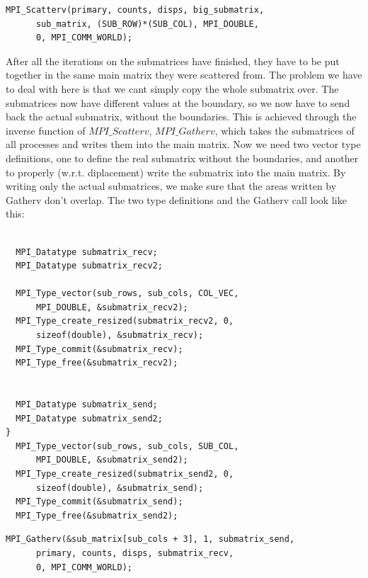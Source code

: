 \documentclass[11pt]{article}
\begin{document}
	
\begin{lstlisting}[label=some-code, caption=$MPI\_Scatterv$ call]
  MPI_Scatterv(primary, counts, disps, big_submatrix, 
      sub_matrix, (SUB_ROW)*(SUB_COL), MPI_DOUBLE, 
      0, MPI_COMM_WORLD);
\end{lstlisting}
	
After all the iterations on the submatrices have finished, they have to be put together in the same main matrix they were scattered from. The problem we have to deal with here is that we
cant simply copy the whole submatrix over. The submatrices now have different values at the boundary, so we now have to send back the actual submatrix, without the boundaries. This is achieved 
through the inverse function of $MPI\_Scatterv$, $MPI\_Gatherv$, which takes the submatrices of all processes and writes them into the main matrix. Now we need two vector type definitions, one to define the
real submatrix without the boundaries, and another to properly (w.r.t. diplacement) write the submatrix into the main matrix. By writing only the actual submatrices, we make sure that the areas written by 
Gatherv don't overlap. The two type definitions and the Gatherv call look like this:\\
\vspace{1 cm}
\begin{lstlisting}[label=some-code, caption=Receive vector types definition]
  
  MPI_Datatype submatrix_recv;
  MPI_Datatype submatrix_recv2;

  MPI_Type_vector(sub_rows, sub_cols, COL_VEC, 
      MPI_DOUBLE, &submatrix_recv2);
  MPI_Type_create_resized(submatrix_recv2, 0, 
      sizeof(double), &submatrix_recv);
  MPI_Type_commit(&submatrix_recv);
  MPI_Type_free(&submatrix_recv2);

  
  MPI_Datatype submatrix_send;
  MPI_Datatype submatrix_send2;
}
  MPI_Type_vector(sub_rows, sub_cols, SUB_COL, 
      MPI_DOUBLE, &submatrix_send2);
  MPI_Type_create_resized(submatrix_send2, 0, 
      sizeof(double), &submatrix_send);
  MPI_Type_commit(&submatrix_send);
  MPI_Type_free(&submatrix_send2);
\end{lstlisting}

	
\begin{lstlisting}[label=some-code, caption=$MPI\_Gatherv$ call]
  MPI_Gatherv(&sub_matrix[sub_cols + 3], 1, submatrix_send, 
      primary, counts, disps, submatrix_recv,
      0, MPI_COMM_WORLD);
\end{lstlisting}
\end{document}
